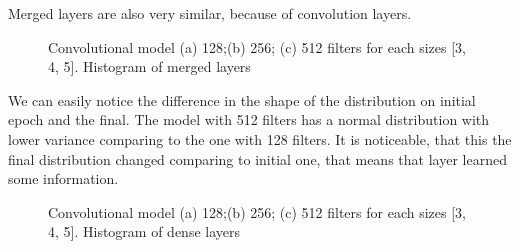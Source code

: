 \noindent
\\
\\
\\
\\
\\
Merged layers are also very similar, because of convolution layers.

\begin{figure}[ht]
	\begin{minipage}[ht]{1\linewidth}
	\end{minipage}
	\hfill
	\begin{minipage}[ht]{1\linewidth}
	\end{minipage}
	\begin{minipage}[ht]{1\linewidth}
	\end{minipage}
	\caption{Convolutional model (a) 128;(b) 256; (c) 512 filters for each sizes [3, 4, 5]. Histogram of merged layers}
	\label{img:3CNN_merged_layers}  
\end{figure}

\clearpage
We can easily notice the difference in the shape of the distribution on initial epoch and the final. The model with 512 filters has a normal distribution with lower variance comparing to the one with 128 filters. It is noticeable, that this the final distribution changed comparing to initial one, that means that layer learned some information. 

\begin{figure}[ht]
	\begin{minipage}[ht]{1\linewidth}
	\end{minipage}
	\hfill
	\begin{minipage}[ht]{1\linewidth}
	\end{minipage}
	\begin{minipage}[ht]{1\linewidth}
	\end{minipage}
	\caption{Convolutional model (a) 128;(b) 256; (c) 512 filters for each sizes [3, 4, 5]. Histogram of dense layers}
	\label{img:3CNN_dense_layers}  
\end{figure}

